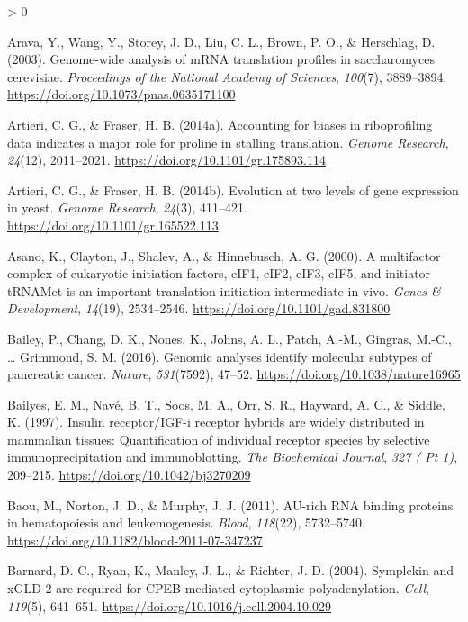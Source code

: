 \documentclass[
  12pt,
  openany]{book}
\newlength{\cslhangindent}
\newenvironment{CSLReferences}[2] %
 {%
  \setlength{\parindent}{0pt}
  \ifodd #1 \everypar{\setlength{\hangindent}{\cslhangindent}}\ignorespaces\fi
  \ifnum #2 > 0
  \setlength{\parskip}{#2\baselineskip}
  \fi
 }%
 {}
\begin{document}
\begin{CSLReferences}{1}{0}
\leavevmode\hypertarget{ref-Arava2003}{}%
Arava, Y., Wang, Y., Storey, J. D., Liu, C. L., Brown, P. O., \& Herschlag, D. (2003). Genome-wide analysis of {mRNA} translation profiles in saccharomyces cerevisiae. \emph{Proceedings of the National Academy of Sciences}, \emph{100}(7), 3889--3894. \url{https://doi.org/10.1073/pnas.0635171100}

\leavevmode\hypertarget{ref-Artieri2014a}{}%
Artieri, C. G., \& Fraser, H. B. (2014a). Accounting for biases in riboprofiling data indicates a major role for proline in stalling translation. \emph{Genome Research}, \emph{24}(12), 2011--2021. \url{https://doi.org/10.1101/gr.175893.114}

\leavevmode\hypertarget{ref-Artieri2014}{}%
Artieri, C. G., \& Fraser, H. B. (2014b). Evolution at two levels of gene expression in yeast. \emph{Genome Research}, \emph{24}(3), 411--421. \url{https://doi.org/10.1101/gr.165522.113}

\leavevmode\hypertarget{ref-Asano2000}{}%
Asano, K., Clayton, J., Shalev, A., \& Hinnebusch, A. G. (2000). A multifactor complex of eukaryotic initiation factors, {eIF}1, {eIF}2, {eIF}3, {eIF}5, and initiator {tRNAMet} is an important translation initiation intermediate in vivo. \emph{Genes \& Development}, \emph{14}(19), 2534--2546. \url{https://doi.org/10.1101/gad.831800}

\leavevmode\hypertarget{ref-Bailey2016}{}%
Bailey, P., Chang, D. K., Nones, K., Johns, A. L., Patch, A.-M., Gingras, M.-C., \ldots{} Grimmond, S. M. (2016). Genomic analyses identify molecular subtypes of pancreatic cancer. \emph{Nature}, \emph{531}(7592), 47--52. \url{https://doi.org/10.1038/nature16965}

\leavevmode\hypertarget{ref-Bailyes1997}{}%
Bailyes, E. M., Navé, B. T., Soos, M. A., Orr, S. R., Hayward, A. C., \& Siddle, K. (1997). Insulin receptor/{IGF}-i receptor hybrids are widely distributed in mammalian tissues: Quantification of individual receptor species by selective immunoprecipitation and immunoblotting. \emph{The Biochemical Journal}, \emph{327 ( Pt 1)}, 209--215. \url{https://doi.org/10.1042/bj3270209}

\leavevmode\hypertarget{ref-Baou2011}{}%
Baou, M., Norton, J. D., \& Murphy, J. J. (2011). {AU}-rich {RNA} binding proteins in hematopoiesis and leukemogenesis. \emph{Blood}, \emph{118}(22), 5732--5740. \url{https://doi.org/10.1182/blood-2011-07-347237}

\leavevmode\hypertarget{ref-Barnard2004}{}%
Barnard, D. C., Ryan, K., Manley, J. L., \& Richter, J. D. (2004). Symplekin and {xGLD}-2 are required for {CPEB}-mediated cytoplasmic polyadenylation. \emph{Cell}, \emph{119}(5), 641--651. \url{https://doi.org/10.1016/j.cell.2004.10.029}


\end{CSLReferences}
\end{document}
